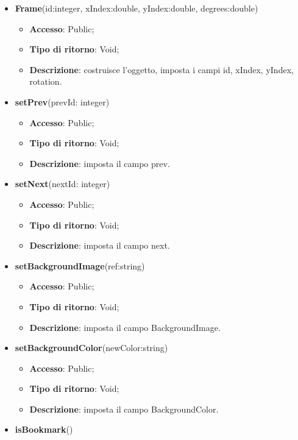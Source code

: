 {{		
		\begin{itemize}
			\item \textbf{Frame}(id:integer, xIndex:double, yIndex:double, degrees:double)
			\begin{itemize}
				\item \textbf{Accesso}: Public;
				\item \textbf{Tipo di ritorno}: Void;
				\item \textbf{Descrizione}: costruisce l’oggetto, imposta i campi id, xIndex, yIndex, rotation.
			\end{itemize}
			\item \textbf{setPrev}(prevId: integer)
			\begin{itemize}
				\item \textbf{Accesso}: Public;
				\item \textbf{Tipo di ritorno}: Void;
				\item \textbf{Descrizione}: imposta il campo prev.
			\end{itemize}
			\item \textbf{setNext}(nextId: integer)
			\begin{itemize}
				\item \textbf{Accesso}: Public;
				\item \textbf{Tipo di ritorno}: Void;
				\item \textbf{Descrizione}: imposta il campo next.
			\end{itemize}
			\item \textbf{setBackgroundImage}(ref:string)
			\begin{itemize}
				\item \textbf{Accesso}: Public;
				\item \textbf{Tipo di ritorno}: Void;
				\item \textbf{Descrizione}: imposta il campo BackgroundImage.
			\end{itemize}
			\item \textbf{setBackgroundColor}(newColor:string)
			\begin{itemize}
				\item \textbf{Accesso}: Public;
				\item \textbf{Tipo di ritorno}: Void;
				\item \textbf{Descrizione}: imposta il campo BackgroundColor.
			\end{itemize}
			\item \textbf{isBookmark}()
			\begin{itemize}

\end{itemize}
\end{itemize}}}

